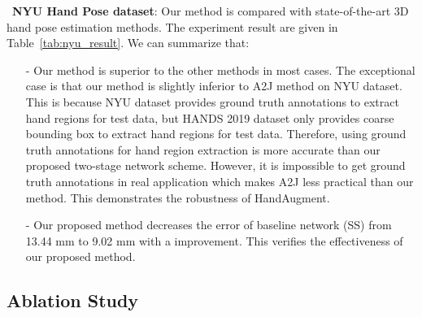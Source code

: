 \documentclass{article}
\begin{document}
~\textbf{NYU Hand Pose dataset}:
Our method is compared with state-of-the-art 3D hand pose estimation methods.
The experiment result are given in Table~\ref{tab:nyu_result}. We can summarize that:
\begin{itemize}
\item[-] Our method is superior to the other methods in most cases. The exceptional case is that our method is slightly inferior to A2J method on NYU dataset. This is because NYU dataset provides ground truth annotations to extract hand regions for test data, but HANDS 2019 dataset only provides coarse bounding box to extract hand regions for test data. Therefore, using ground truth annotations for hand region extraction is more accurate than our proposed two-stage network scheme. However, it is impossible to get ground truth annotations in real application which makes A2J less practical than our method.
This demonstrates the robustness of HandAugment.
\item[-] Our proposed method decreases the error of baseline network (SS) from 13.44 mm to 9.02 mm with a  improvement. This verifies the effectiveness of our proposed method.
\end{itemize}



\subsection{Ablation Study}\label{sec:ablation}
\end{document}

